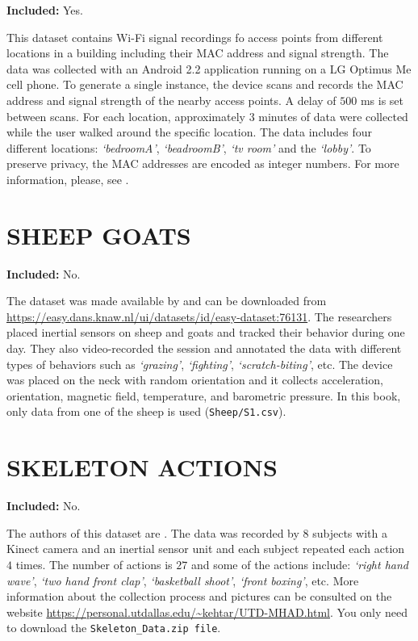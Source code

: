 \documentclass[
  11pt,
]{krantz}
\begin{document}
\textbf{Included:} Yes.

This dataset contains Wi-Fi signal recordings fo access points from different locations in a building including their MAC address and signal strength. The data was collected with an Android 2.2 application running on a LG Optimus Me cell phone. To generate a single instance, the device scans and records the MAC address and signal strength of the nearby access points. A delay of \(500\) ms is set between scans. For each location, approximately \(3\) minutes of data were collected while the user walked around the specific location. The data includes four different locations: \emph{`bedroomA'}, \emph{`beadroomB'}, \emph{`tv room'} and the \emph{`lobby'}. To preserve privacy, the MAC addresses are encoded as integer numbers. For more information, please, see \citet{Garcia2012WiFi}.

\hypertarget{sheep-goats}{%
\section{SHEEP GOATS}\label{sheep-goats}}

\textbf{Included:} No.

The dataset was made available by \citet{kamminga2017} and can be downloaded from \url{https://easy.dans.knaw.nl/ui/datasets/id/easy-dataset:76131}. The researchers placed inertial sensors on sheep and goats and tracked their behavior during one day. They also video-recorded the session and annotated the data with different types of behaviors such as \emph{`grazing'}, \emph{`fighting'}, \emph{`scratch-biting'}, etc. The device was placed on the neck with random orientation and it collects acceleration, orientation, magnetic field, temperature, and barometric pressure. In this book, only data from one of the sheep is used (\texttt{Sheep/S1.csv}).

\hypertarget{skeleton-actions}{%
\section{SKELETON ACTIONS}\label{skeleton-actions}}

\textbf{Included:} No.

The authors of this dataset are \citet{chen2015utd}. The data was recorded by \(8\) subjects with a Kinect camera and an inertial sensor unit and each subject repeated each action \(4\) times. The number of actions is \(27\) and some of the actions include: \emph{`right hand wave'}, \emph{`two hand front clap'}, \emph{`basketball shoot'}, \emph{`front boxing'}, etc. More information about the collection process and pictures can be consulted on the website \url{https://personal.utdallas.edu/~kehtar/UTD-MHAD.html}. You only need to download the \texttt{Skeleton\_Data.zip\ file}.
\end{document}
